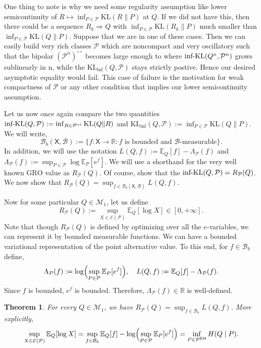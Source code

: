 \documentclass[11pt]{article}
\newcommand{\KL}{\mathrm{KL}}
\newcommand{\KLinf}{\mathrm{KL}_{\mathrm{inf}}}
\newcommand{\infKL}{\textnormal{inf-KL}}
\newcommand{\E}{\mathbb{E}}
\newcommand{\Pcal}{\mathcal{P}}
\newcommand{\X}{\mathsf{X}}
\newcommand{\B}{\mathcal{B}}
\newcommand{\Bb}{\mathcal{B}_b}
\newtheorem{theorem}{Theorem}[section]
\theoremstyle{definition}
\theoremstyle{definition}
\begin{document}
One thing to note is why we need some regularity assumption like lower semicontinuity of $R\mapsto \inf_{P\in\Pcal}\KL(R\|P)$ at $Q$. If we did not have this, then there could be a sequence $R_k\Rightarrow Q$ with $\inf_{P\in\Pcal}\KL(R_k\|P)$ much smaller than $\inf_{P\in\Pcal}\KL(Q\|P)$. Suppose that we are in one of these cases. Then we can easily build very rich classes $\Pcal$ which are noncompact and very oscillatory such that the bipolar $(\Pcal^n)^{\circ\circ}$ becomes large enough to where $\infKL(Q^n, \Pcal^n)$ grows sublinearly in n, while the $\KLinf(Q, \Pcal)$ stays strictly postive. Hence our desired asymptotic equality would fail. This case of failure is the motivation for weak compactness of $\Pcal$ or any other condition that implies our lower semicontinuity assumption.

Let us now once again compare the two quantities $\infKL(Q,\mathcal P):=\inf_{R\in\Pcal^{\circ\circ}}\KL(Q\|R)$ and $\KLinf(Q,\mathcal P):=\inf_{P\in\mathcal P}\KL(Q\|P)$. We will write,
\[
\mathcal B_b(\X,\B):=\{f:\X\to\mathbb R: f \text{ is bounded and }\B\text{-measurable}\}.
\]
In addition, we will use the notation $L(Q, f):=\E_Q[f]-\Lambda_{\mathcal P}(f)$ and $\Lambda_{\Pcal}(f):=\sup_{P\in\Pcal}\log \E_P[e^f]$. We will use a shorthand for the very well known $\mathrm{GRO}$ value as $R_{\mathcal P}(Q)$. Of course, \parencite{larsson2025numeraire} show that the $\infKL(Q,\mathcal P)=R_{\mathcal P}(Q)$. We now show that $R_{\mathcal P}(Q)=\sup_{f\in\mathcal B_b(\X,\B)}L(Q,f)$. 

Now for some particular $Q\in\mathcal M_1$, let us define $$R_{\mathcal{P}}(Q):=\sup_{X\in\mathcal{E}(\mathcal{P})} \E_{Q}[\log X]\in[0,+\infty].$$ 
Note that though $R_{\mathcal P}(Q)$ is defined by optimizing over all the $e$-variables, we can represent it by bounded measurable functions. We can have a bounded variational representation of the point alternative value. To this end, for $f\in\Bb$ define,
\[
\Lambda_{\mathcal{P}}(f):=\log\Bigl(\sup_{P\in\mathcal{P}}\E_P[e^f]\Bigr),\quad
L(Q,f):=\E_{Q}[f]-\Lambda_{\mathcal{P}}(f).
\]
Since $f$ is bounded, $e^f$ is bounded. Therefore, $\Lambda_{\mathcal P}(f)\in\mathbb R$ is well-defined.

\begin{theorem}\label{thm:bounded-representation}
For every $Q\in\mathcal M_1$, we have $R_{\mathcal P}(Q)=\sup_{f\in\Bb} L(Q,f)$. More explicitly,
\[
\sup_{X\in\mathcal{E}(\mathcal{P})} \E_{Q}[\log X] = \sup_{f\in\Bb} \E_{Q}[f] - \log\Bigl(\sup_{P\in\mathcal{P}}\E_P[e^f]\Bigr) = \inf_{P\in\mathcal{P}^{\mathrm{Eff}}} H(Q\mid P).
\]
\end{theorem}
\end{document}
